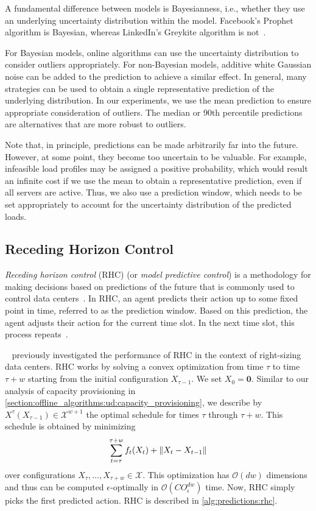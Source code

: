 A fundamental difference between models is Bayesianness, i.e., whether they use an underlying uncertainty distribution within the model. Facebook's Prophet algorithm is Bayesian, whereas LinkedIn's Greykite algorithm is not~\cite{Taylor2017, Hosseini2021}.

For Bayesian models, online algorithms can use the uncertainty distribution to consider outliers appropriately. For non-Bayesian models, additive white Gaussian noise can be added to the prediction to achieve a similar effect. In general, many strategies can be used to obtain a single representative prediction of the underlying distribution. In our experiments, we use the mean prediction to ensure appropriate consideration of outliers. The median or 90th percentile predictions are alternatives that are more robust to outliers.

Note that, in principle, predictions can be made arbitrarily far into the future. However, at some point, they become too uncertain to be valuable. For example, infeasible load profiles may be assigned a positive probability, which would result an infinite cost if we use the mean to obtain a representative prediction, even if all servers are active. Thus, we also use a prediction window, which needs to be set appropriately to account for the uncertainty distribution of the predicted loads.

\subsection{Receding Horizon Control}

\emph{Receding horizon control} (RHC) (or \emph{model predictive control}) is a methodology for making decisions based on predictions of the future that is commonly used to control data centers~\cite{Lin2012}. In RHC, an agent predicts their action up to some fixed point in time, referred to as the prediction window. Based on this prediction, the agent adjusts their action for the current time slot. In the next time slot, this process repeats~\cite{Zak2017}.

\citeauthor*{Lin2012}~\cite{Lin2012} previously investigated the performance of RHC in the context of right-sizing data centers. RHC works by solving a convex optimization from time $\tau$ to time $\tau + w$ starting from the initial configuration $X_{\tau-1}$. We set $X_0 = \mathbf{0}$. Similar to our analysis of capacity provisioning in \cref{section:offline_algorithms:ud:capacity_provisioning}, we describe by $X^{\tau}(X_{\tau-1}) \in \mathcal{X}^{w+1}$ the optimal schedule for times $\tau$ through $\tau+w$. This schedule is obtained by minimizing \begin{align}\label{eq:rhc}
    \sum_{t=\tau}^{\tau+w} f_t(X_t) + \lVert X_t - X_{t-1}\rVert
\end{align} over configurations $X_{\tau}, \dots, X_{\tau+w} \in \mathcal{X}$. This optimization has $\mathcal{O}(d w)$ dimensions and thus can be computed $\epsilon$-optimally in $\mathcal{O}(C O_{\epsilon}^{dw})$ time. Now, RHC simply picks the first predicted action. RHC is described in \cref{alg:predictions:rhc}.


